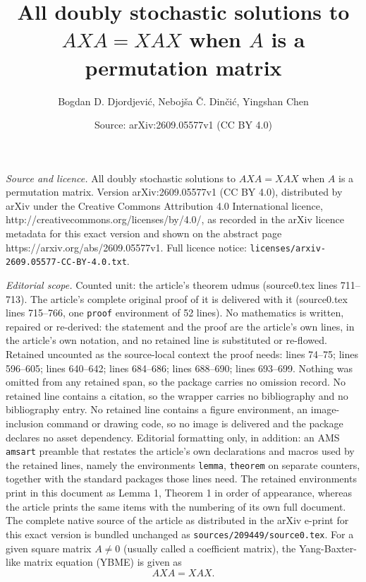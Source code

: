 \documentclass[10pt,a4paper]{amsart}
\title{All doubly stochastic solutions to $AXA = XAX$ when $A$ is a permutation matrix}
\author{Bogdan D. Djordjevi\'c, Neboj\v{s}a \v{C}. Din\v{c}i\'c, Yingshan Chen}
\date{Source: arXiv:2609.05577v1 (CC BY 4.0)}
\begin{document}
\maketitle

\noindent\emph{Source and licence.} All doubly stochastic solutions to $AXA = XAX$ when $A$ is a permutation matrix. Version arXiv:2609.05577v1 (CC BY 4.0), distributed by arXiv under the Creative Commons Attribution 4.0 International licence, http://creativecommons.org/licenses/by/4.0/, as recorded in the arXiv licence metadata for this exact version and shown on the abstract page https://arxiv.org/abs/2609.05577v1. Full licence notice: \texttt{licenses/arxiv-2609.05577-CC-BY-4.0.txt}.\par\smallskip

\noindent\textit{Editorial scope.} Counted unit: the article's theorem udmus (source0.tex lines 711--713). The article's complete original proof of it is delivered with it (source0.tex lines 715--766, one \texttt{proof} environment of 52 lines). No mathematics is written, repaired or re-derived: the statement and the proof are the article's own lines, in the article's own notation, and no retained line is substituted or re-flowed.  Retained uncounted as the source-local context the proof needs: lines 74--75; lines 596--605; lines 640--642; lines 684--686; lines 688--690; lines 693--699.  Nothing was omitted from any retained span, so the package carries no omission record.  No retained line contains a citation, so the wrapper carries no bibliography and no bibliography entry.  No retained line contains a figure environment, an image-inclusion command or drawing code, so no image is delivered and the package declares no asset dependency.  Editorial formatting only, in addition: an AMS \texttt{amsart} preamble that restates the article's own declarations and macros used by the retained lines, namely the environments \texttt{lemma}, \texttt{theorem} on separate counters, together with the standard packages those lines need.  The retained environments print in this document as Lemma 1, Theorem 1 in order of appearance, whereas the article prints the same items with the numbering of its own full document.  The complete native source of the article as distributed in the arXiv e-print for this exact version is bundled unchanged as \texttt{sources/209449/source0.tex}.
	For a given square matrix $A\neq0$ (usually called a coefficient matrix), the Yang-Baxter-like matrix equation (YBME) is given as \begin{equation}
		\label{YBME} AXA=XAX.\end{equation}
\end{document}
